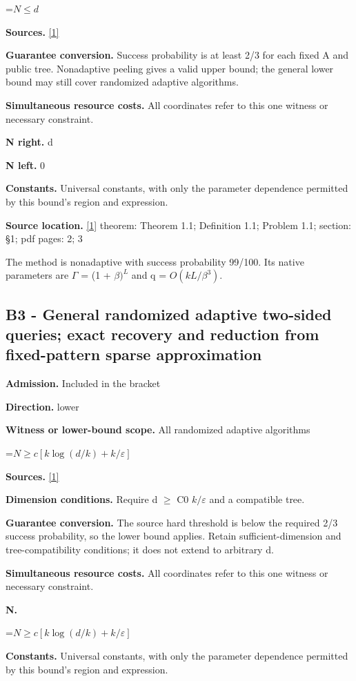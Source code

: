 \documentclass[10pt,a4paper]{article}
\newcommand{\AtlasMath}[1]{\par\begingroup\centering\setbox0=\hbox{$\displaystyle #1$}\ifdim\wd0>1.4\linewidth\typeout{ATLAS WIDE FORMULA: \the\wd0}\fi\ifdim\wd0>\linewidth\resizebox{\linewidth}{!}{\box0}\else\box0\fi\par\endgroup}
\begin{document}
\AtlasMath{N\le d}
\textbf{Sources.} \href{https://arxiv.org/pdf/2407.04686v2}{[1]}

\textbf{Guarantee conversion.} Success probability is at least 2/3 for each fixed A and public tree. Nonadaptive peeling gives a valid upper bound; the general lower bound may still cover randomized adaptive algorithms.

\textbf{Simultaneous resource costs.} All coordinates refer to this one witness or necessary constraint.

\textbf{N right.} d

\textbf{N left.} 0

\textbf{Constants.} Universal constants, with only the parameter dependence permitted by this bound’s region and expression.

\textbf{Source location.} \href{https://arxiv.org/pdf/2407.04686v2}{[1]} theorem: Theorem 1.1; Definition 1.1; Problem 1.1; section: §1; pdf pages: 2; 3

The method is nonadaptive with success probability 99/100. Its native parameters are $\Gamma$ = (1 + $\beta )^L$ and q = $O(kL/\beta ^3)$.

\subsection{B3 - General randomized adaptive two-sided queries; exact recovery and reduction from fixed-pattern sparse approximation}
\textbf{Admission.} Included in the bracket

\textbf{Direction.} lower

\textbf{Witness or lower-bound scope.} All randomized adaptive algorithms

\AtlasMath{N\ge c[k\log(d/k)+k/\varepsilon]}
\textbf{Sources.} \href{https://arxiv.org/pdf/2407.04686v2}{[1]}

\textbf{Dimension conditions.} Require d $\ge$ C0 $k/\varepsilon$ and a compatible tree.

\textbf{Guarantee conversion.} The source hard threshold is below the required 2/3 success probability, so the lower bound applies. Retain sufficient-dimension and tree-compatibility conditions; it does not extend to arbitrary d.

\textbf{Simultaneous resource costs.} All coordinates refer to this one witness or necessary constraint.

\textbf{N.}

\AtlasMath{N\ge c[k\log(d/k)+k/\varepsilon]}
\textbf{Constants.} Universal constants, with only the parameter dependence permitted by this bound’s region and expression.
\end{document}
